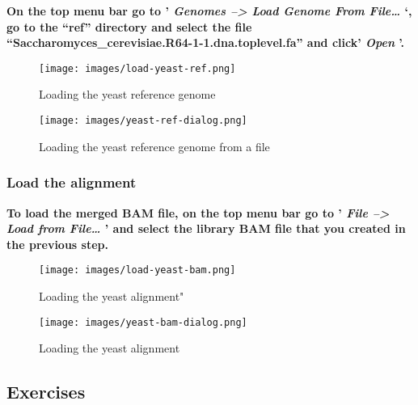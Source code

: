 \documentclass[11pt]{article}
\begin{document}
\textbf{On the top menu bar go to ' \textit{Genomes --\textgreater{} Load
Genome From File\ldots{}} `, go to the ``ref'' directory and select the
file ``Saccharomyces\_cerevisiae.R64-1-1.dna.toplevel.fa'' and click'
\textit{Open} '.}

    \begin{figure}
\centering
\texttt{[image: images/load-yeast-ref.png]}
\caption{Loading the yeast reference genome}
\end{figure}

    \begin{figure}
\centering
\texttt{[image: images/yeast-ref-dialog.png]}
\caption{Loading the yeast reference genome from a file}
\end{figure}

    \hypertarget{load-the-alignment}{%
\subsubsection{Load the alignment}\label{load-the-alignment}}

\textbf{To load the merged BAM file, on the top menu bar go to '
\textit{File --\textgreater{} Load from File\ldots{}} ' and select the
library BAM file that you created in the previous step.}

    \begin{figure}
\centering
\texttt{[image: images/load-yeast-bam.png]}
\caption{Loading the yeast alignment"}
\end{figure}

    \begin{figure}
\centering
\texttt{[image: images/yeast-bam-dialog.png]}
\caption{Loading the yeast alignment}
\end{figure}

    \hypertarget{exercises}{%
\subsection{Exercises}\label{exercises}}
\end{document}
